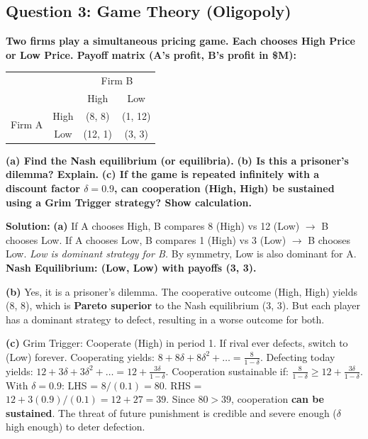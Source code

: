 \documentclass[10pt,a4paper]{article}
\begin{document}
\begin{multicols}{2}
\subsection*{Question 3: Game Theory (Oligopoly)}
\textbf{Two firms play a simultaneous pricing game. Each chooses High Price or Low Price. Payoff matrix (A's profit, B's profit in \$M):}

\begin{center}
\begin{tabular}{cc|c|c|}
\multicolumn{2}{c}{} & \multicolumn{2}{c}{Firm B} \\
\multicolumn{2}{c}{} & High & Low \\
\cline{3-4}
\multirow{2}{*}{Firm A} & High & (8, 8) & (1, 12) \\
\cline{3-4}
& Low & (12, 1) & (3, 3) \\
\cline{3-4}
\end{tabular}
\end{center}

\textbf{(a) Find the Nash equilibrium (or equilibria).}
\textbf{(b) Is this a prisoner's dilemma? Explain.}
\textbf{(c) If the game is repeated infinitely with a discount factor $\delta = 0.9$, can cooperation (High, High) be sustained using a Grim Trigger strategy? Show calculation.}

\vspace{0.05cm}
\textbf{Solution:}
\vspace{0.05cm}
\textbf{(a)}
If A chooses High, B compares 8 (High) vs 12 (Low) $\to$ B chooses Low.
If A chooses Low, B compares 1 (High) vs 3 (Low) $\to$ B chooses Low.
\textit{Low is dominant strategy for B.} By symmetry, Low is also dominant for A.
\textbf{Nash Equilibrium: (Low, Low) with payoffs (3, 3).}

\textbf{(b)} Yes, it is a prisoner's dilemma. The cooperative outcome (High, High) yields (8, 8), which is \textbf{Pareto superior} to the Nash equilibrium (3, 3). But each player has a dominant strategy to defect, resulting in a worse outcome for both.

\textbf{(c)} Grim Trigger: Cooperate (High) in period 1. If rival ever defects, switch to (Low) forever.
Cooperating yields: $8 + 8\delta + 8\delta^2 + \dots = \frac{8}{1-\delta}$.
Defecting today yields: $12 + 3\delta + 3\delta^2 + \dots = 12 + \frac{3\delta}{1-\delta}$.
Cooperation sustainable if: $\frac{8}{1-\delta} \geq 12 + \frac{3\delta}{1-\delta}$.
With $\delta = 0.9$: LHS = $8/(0.1) = 80$. RHS = $12 + 3(0.9)/(0.1) = 12 + 27 = 39$.
Since $80 > 39$, cooperation \textbf{can be sustained}. The threat of future punishment is credible and severe enough ($\delta$ high enough) to deter defection.


\end{multicols}
\end{document}
